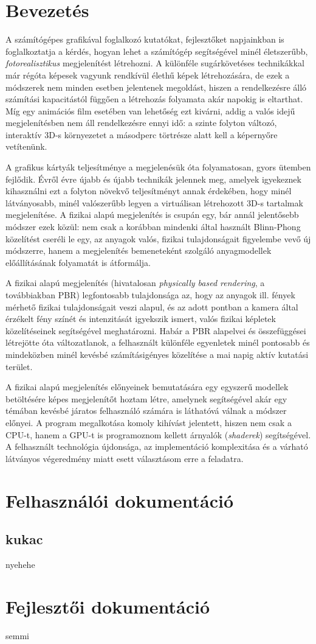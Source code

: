 \documentclass[12pt,oneside]{book}
\begin{document}
\chapter{Bevezetés}
A számítógépes grafikával foglalkozó kutatókat, fejlesztőket napjainkban is foglalkoztatja a kérdés, hogyan lehet a számítógép segítségével minél életszerűbb, \textit{fotorealisztikus} megjelenítést létrehozni. A különféle sugárkövetéses technikákkal már régóta képesek vagyunk rendkívül élethű képek létrehozására, de ezek a módszerek nem minden esetben jelentenek megoldást, hiszen a rendelkezésre álló számítási kapacitástól függően a létrehozás folyamata akár napokig is eltarthat. Míg egy animációs film esetében van lehetőség ezt kivárni, addig a valós idejű megjelenítésben nem áll rendelkezésre ennyi idő: a szinte folyton változó, interaktív 3D-s környezetet a másodperc törtrésze alatt kell a képernyőre vetítenünk.

A grafikus kártyák teljesítménye a megjelenésük óta folyamatosan, gyors ütemben fejlődik. Évről évre újabb és újabb technikák jelennek meg, amelyek igyekeznek kihasználni ezt a folyton növekvő teljesítményt annak érdekében, hogy minél látványosabb, minél valószerűbb legyen a virtuálisan létrehozott 3D-s tartalmak megjelenítése. A fizikai alapú megjelenítés is csupán egy, bár annál jelentősebb módszer ezek közül: nem csak a korábban mindenki által használt Blinn-Phong közelítést cseréli le egy, az anyagok valós, fizikai tulajdonságait figyelembe vevő új módszerre, hanem a megjelenítés bemeneteként szolgáló anyagmodellek előállításának folyamatát is átformálja.

A fizikai alapú megjelenítés (hivatalosan \textit{physically based rendering}, a továbbiakban PBR) legfontosabb tulajdonsága az, hogy az anyagok ill. fények mérhető fizikai tulajdonságait veszi alapul, és az adott pontban a kamera által érzékelt fény színét és intenzitását igyekszik ismert, valós fizikai képletek közelítéseinek segítségével meghatározni. Habár a PBR alapelvei és összefüggései létrejötte óta változatlanok, a felhasznált különféle egyenletek minél pontosabb és mindeközben minél kevésbé számításigényes közelítése a mai napig aktív kutatási terület.

A fizikai alapú megjelenítés előnyeinek bemutatására egy egyszerű modellek betöltésére képes megjelenítőt hoztam létre, amelynek segítségével akár egy témában kevésbé járatos felhasználó számára is láthatóvá válnak a módszer előnyei. A program megalkotása komoly kihívást jelentett, hiszen nem csak a CPU-t, hanem a GPU-t is programoznom kellett árnyalók (\textit{shaderek}) segítségével. A felhasznált technológia újdonsága, az implementáció komplexitása és a várható látványos végeredmény miatt esett választásom erre a feladatra.


\chapter{Felhasználói dokumentáció}
\section{kukac}
nyehehe

\chapter{Fejlesztői dokumentáció}
semmi
\end{document}
